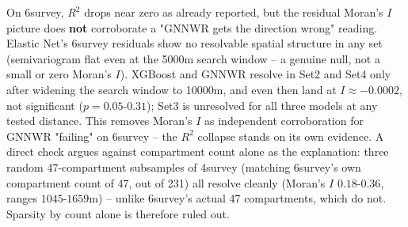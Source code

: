On 6survey, $R^2$ drops near zero as already reported, but the residual Moran's $I$ picture does \textbf{not} corroborate a "GNNWR gets the direction wrong" reading. Elastic Net's 6survey residuals show no resolvable spatial structure in any set (semivariogram flat even at the 5000m search window -- a genuine null, not a small or zero Moran's $I$). XGBoost and GNNWR resolve in Set2 and Set4 only after widening the search window to 10000m, and even then land at $I\approx-0.0002$, not significant ($p=0.05$-$0.31$); Set3 is unresolved for all three models at any tested distance.  This removes Moran's $I$ as independent corroboration for GNNWR "failing" on 6survey -- the $R^2$ collapse stands on its own evidence. A direct check argues against compartment count alone as the explanation: three random 47-compartment subsamples of 4survey (matching 6survey's own compartment count of 47, out of 231) all resolve cleanly (Moran's $I$ $0.18$-$0.36$, ranges $1045$-$1659$m) -- unlike 6survey's actual 47 compartments, which do not. Sparsity by count alone is therefore ruled out. 

